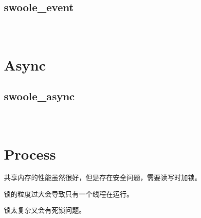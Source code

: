 \section{swoole\_event}



\begin{lstlisting}[language=bash]

\end{lstlisting}




\begin{lstlisting}[language=bash]

\end{lstlisting}




\begin{lstlisting}[language=bash]

\end{lstlisting}


\chapter{Async}




\section{swoole\_async}



\begin{lstlisting}[language=bash]

\end{lstlisting}




\begin{lstlisting}[language=bash]

\end{lstlisting}




\begin{lstlisting}[language=bash]

\end{lstlisting}


\chapter{Process}


共享内存的性能虽然很好，但是存在安全问题，需要读写时加锁。

\begin{compactitem}
\item 锁的粒度过大会导致只有一个线程在运行。
\item 锁太复杂又会有死锁问题。
\end{compactitem}



